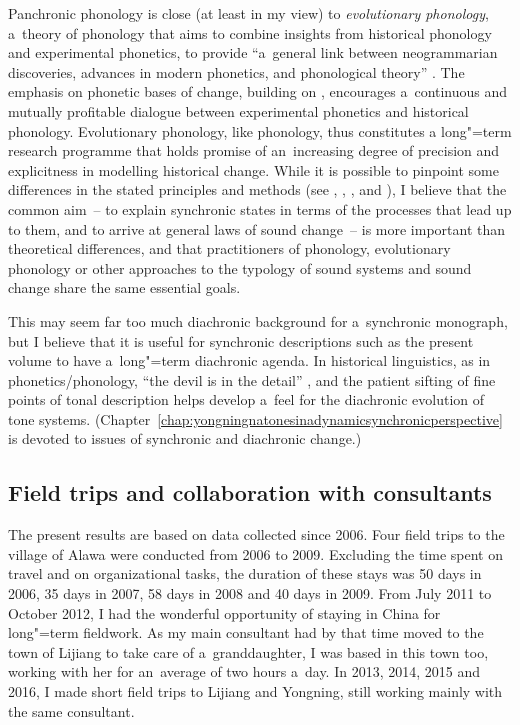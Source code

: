 Panchronic phonology is close (at least in my view) to \textit{evolutionary phonology}, a~theory of phonology that aims to combine insights from historical phonology and experimental phonetics, to provide “a~general link between neogrammarian discoveries, advances in modern phonetics, and phonological theory” \citep[xiii]{blevins2004}. The emphasis on phonetic bases of change, building on \citet{ohala1989}, encourages a~continuous and mutually profitable dialogue between experimental phonetics and historical phonology. Evolutionary phonology, like  phonology, thus constitutes a long"=term research programme that holds promise of an~increasing degree of
precision and explicitness in modelling historical change. While it is possible to pinpoint some differences in the stated principles and methods (see \citealt[601]{labov1994}, \citealt{andersen2006}, \citealt{iverson2006}, \citealt{mazaudonetal2007} and \citealt{smithetal2008}), I believe that the common aim~-- to explain
synchronic states in terms of the processes that lead up to them, and to arrive at general laws of
sound change~-- is more important than theoretical
differences, and that practitioners of  phonology, evolutionary phonology or other
approaches to the typology of sound systems and sound change share the same essential goals. 

This may seem far too much {diachronic} background for a~synchronic monograph, but I believe that it is useful for synchronic descriptions such as the present volume to have a~long"=term {diachronic} agenda. In historical linguistics, as in phonetics/phonology, “the devil is in the detail” \citep{nolan2003}, and the patient sifting of fine points of tonal description helps develop a~feel for the {diachronic} evolution of tone systems. (Chapter~\ref{chap:yongningnatonesinadynamicsynchronicperspective} is devoted to issues of synchronic  and {diachronic} change.) 


\subsection{Field trips and collaboration with consultants}
\label{sec:collaborationwithconsultants}

The present results are based on data collected since 2006. Four field trips to the village of Alawa were conducted from 2006 to 2009. Excluding the time spent on travel
and on organizational tasks, the {duration} of these stays was 50 days in 2006, 35 days in 2007, 58
days in 2008 and 40 days in 2009. From July 2011 to October 2012, I had the wonderful opportunity of
staying in China for long"=term fieldwork. As my main consultant had by that time moved to the town
of Lijiang to take care of a~granddaughter, I was based in this town too, working with her for
an~average of two hours a~day. In 2013, 2014, 2015 and 2016, I made short field trips to Lijiang and Yongning, still working mainly with the same consultant.

